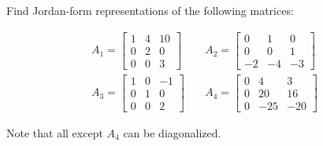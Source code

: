 \item [3.13] Find Jordan-form representations of the following matrices:

\begin{align*}
 A_1 = \begin{bmatrix}
      1 & 4 & 10 \\
      0 & 2 & 0 \\
      0 & 0 & 3
     \end{bmatrix}
& \quad
A_2 = \begin{bmatrix}
       0 & 1 & 0 \\
       0 & 0 & 1 \\
       -2 & -4 & -3
      \end{bmatrix}
\\
A_3 = \begin{bmatrix}
       1 & 0 & -1 \\
       0 & 1 & 0 \\
       0 & 0 & 2
      \end{bmatrix}
& \quad
A_4 = \begin{bmatrix}
       0 & 4 & 3\\
       0 & 20 & 16\\
       0 & -25 & -20
      \end{bmatrix}
\end{align*}

Note that all except $A_4$ can be diagonalized.
